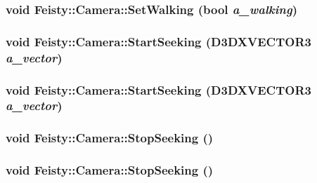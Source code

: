 \hypertarget{class_feisty_1_1_camera_a8392192850c1bece0cc923001f4479b9}{
\subsubsection[{SetWalking}]{\setlength{\rightskip}{0pt plus 5cm}void Feisty::Camera::SetWalking (bool {\em a\_\-walking})}}
\label{class_feisty_1_1_camera_a8392192850c1bece0cc923001f4479b9}
\hypertarget{class_feisty_1_1_camera_a9144982d770e3134fb1b52c82da4669d}{
\subsubsection[{StartSeeking}]{\setlength{\rightskip}{0pt plus 5cm}void Feisty::Camera::StartSeeking (D3DXVECTOR3 {\em a\_\-vector})}}
\label{class_feisty_1_1_camera_a9144982d770e3134fb1b52c82da4669d}
\hypertarget{class_feisty_1_1_camera_a9144982d770e3134fb1b52c82da4669d}{
\subsubsection[{StartSeeking}]{\setlength{\rightskip}{0pt plus 5cm}void Feisty::Camera::StartSeeking (D3DXVECTOR3 {\em a\_\-vector})}}
\label{class_feisty_1_1_camera_a9144982d770e3134fb1b52c82da4669d}
\hypertarget{class_feisty_1_1_camera_ab579f233a45c7a2b629d240c36cdbb61}{
\subsubsection[{StopSeeking}]{\setlength{\rightskip}{0pt plus 5cm}void Feisty::Camera::StopSeeking ()}}
\label{class_feisty_1_1_camera_ab579f233a45c7a2b629d240c36cdbb61}
\hypertarget{class_feisty_1_1_camera_ab579f233a45c7a2b629d240c36cdbb61}{
\subsubsection[{StopSeeking}]{\setlength{\rightskip}{0pt plus 5cm}void Feisty::Camera::StopSeeking ()}}
